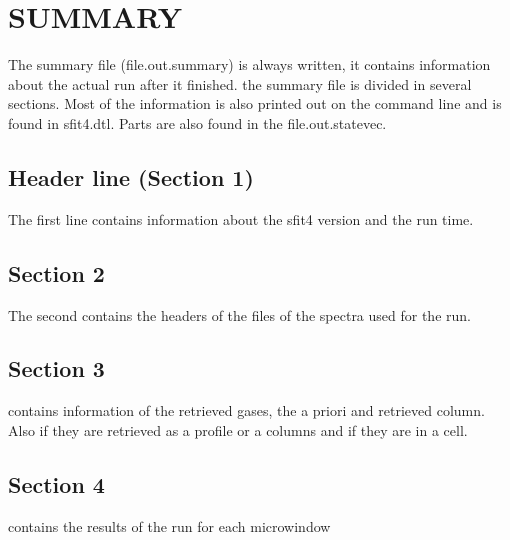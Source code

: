 \documentclass[a4paper]{article}
\begin{document}
\section{SUMMARY}

The summary file (file.out.summary) is always written, it contains information about the actual run after it finished. the summary file is divided in several sections. Most of the information is also printed out on the command line and is found in sfit4.dtl. Parts are also found in the file.out.statevec.

\subsection*{Header line (Section 1)}
The first line contains information about the sfit4 version and the run time.

\subsection*{Section 2}
The second contains the headers of the files of the spectra used for the run.

\subsection*{Section 3}
contains information of the retrieved gases, the a priori and
retrieved column. Also if they are retrieved as a profile or a
columns and if they are in a cell.

\subsection*{Section 4}

contains the results of the run for each microwindow
\end{document}
